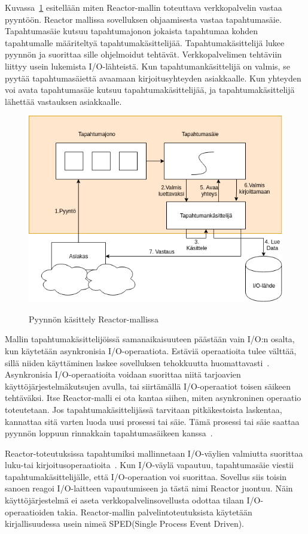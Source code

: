 \documentclass[finnish]{tktltiki2}%
\theoremstyle{definition}
\theoremstyle{remark}
\begin{document}
Kuvassa~\ref{fig:reactor} esitellään miten Reactor-mallin toteuttava verkkopalvelin
vastaa pyyntöön.
Reactor mallissa sovelluksen ohjaamisesta vastaa tapahtumasäie.
Tapahtumasäie kutsuu tapahtumajonon jokaista tapahtumaa kohden tapahtumalle
määriteltyä tapahtumakäsittelijää. Tapahtumakäsittelijä
lukee pyynnön ja suorittaa sille ohjelmoidut tehtävät. Verkkopalvelimen
tehtäviin liittyy usein lukemista I/O-lähteistä.
Kun tapahtumankäsittelijä on valmis, se pyytää tapahtumasäiettä
avaamaan kirjoitusyhteyden asiakkaalle. Kun yhteyden voi avata
tapahtumasäie kutsuu tapahtumakäsittelijää, ja tapahtumakäsittelijä lähettää vastauksen
asiakkaalle.
\begin{figure}
  \centering
  \caption{Pyynnön käsittely Reactor-mallissa}
  \includegraphics[scale=0.6]{reactor.png}\label{fig:reactor}
\end{figure}

Mallin tapahtumakäsittelijöissä samanaikaisuuteen päästään
vain I/O:n osalta, kun käytetään asynkronisia
I/O-operaatiota.
Estäviä operaatioita tulee välttää,
sillä niiden käyttäminen laskee sovelluksen
tehokkuutta huomattavasti~\cite{schmidt_reactor:_1995}.
Asynkronisia I/O-operaatioita
voidaan suorittaa niitä tarjoavien käyttöjärjestelmäkutsujen
avulla, tai siirtämällä I/O-operaatiot toisen säikeen tehtäväksi.
Itse Reactor-malli ei ota kantaa siihen, miten asynkroninen operaatio toteutetaan.
Jos tapahtumakäsittelijässä tarvitaan pitkäkestoista laskentaa,
kannattaa sitä varten luoda uusi prosessi tai säie. Tämä
prosessi tai säie saattaa pyynnön loppuun rinnakkain
tapahtumasäikeen kanssa~\cite{schmidt_reactor:_1995}.

Reactor-toteutuksissa tapahtumiksi mallinnetaan I/O-väylien
valmiutta suorittaa luku-tai kirjoitusoperaatioita~\cite{schmidt_reactor:_1995}.
Kun I/O-väylä
vapautuu, tapahtumasäie viestii tapahtumakäsittelijälle, että 
I/O-operaation voi suorittaa. Sovellus siis toisin sanoen
reagoi I/O-laitteen vapautumiseen ja tästä nimi Reactor juontuu.
Näin käyttöjärjestelmä ei aseta
verkkopalvelinsovellusta odottaa tilaan I/O-operaatioiden takia.
Reactor-mallin palvelintoteutuksista käytetään kirjallisuudessa
usein nimeä SPED(Single Process Event Driven).
\end{document}
